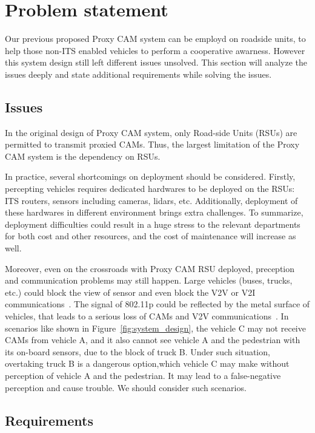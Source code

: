 \section{Problem statement} \label{sec:problem}

Our previous proposed Proxy CAM system can be employd on roadside units,
to help those non-ITS enabled vehicles to perform a cooperative awarness.
However this system design still left different issues unsolved.
This section will analyze the issues deeply and state additional requirements while solving the issues.

\subsection{Issues}
In the original design of Proxy CAM system, only Road-side Units (RSUs) are permitted to transmit proxied CAMs.
Thus, the largest limitation of the Proxy CAM system is the dependency on RSUs.

In practice, several shortcomings on deployment should be considered.
Firstly, percepting vehicles requires dedicated hardwares to be deployed on the RSUs:
ITS routers, sensors including cameras, lidars, etc.
Additionally, deployment of these hardwares in different environment brings extra challenges.
To summarize, deployment difficulties could result in a huge stress to the relevant departments for both cost and other resources,
and the cost of maintenance will increase as well.

Moreover, even on the crossroads with Proxy CAM RSU deployed,
preception and communication problems may still happen.
Large vehicles (buses, trucks, etc.) could block the view of sensor and even block the V2V or V2I communications~\cite{d2014empirical}.
The signal of 802.11p could be reflected by the metal surface of vehicles,
that leads to a serious loss of CAMs and V2V communications~\cite{mecklenbrauker2011vehicular}.
In scenarios like shown in Figure~\ref{fig:system_design},
the vehicle C may not receive CAMs from vehicle A,
and it also cannot see vehicle A and the pedestrian with its on-board sensors, due to the block of truck B.
Under such situation, overtaking truck B is a dangerous option,which vehicle C may make without perception of vehicle A and the pedestrian.
It may lead to a false-negative perception and cause trouble.
We should consider such scenarios.

\subsection{Requirements}


